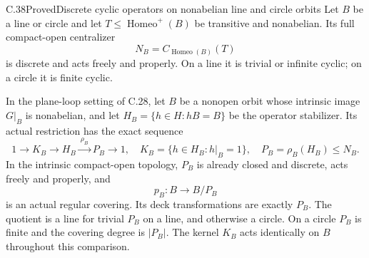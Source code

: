 \begin{claim}{C.38}{Proved}{Discrete cyclic operators on nonabelian line and circle orbits}
Let $B$ be a line or circle and let
$T\leq\operatorname{Homeo}^+(B)$ be transitive and
nonabelian. Its full compact-open centralizer
\[
                  N_B=C_{\operatorname{Homeo}(B)}(T)
                                                        \tag{C.38.1}
\]
is discrete and acts freely and properly. On a line it is
trivial or infinite cyclic; on a circle it is finite cyclic.

In the plane-loop setting of C.28, let $B$ be a nonopen
orbit whose intrinsic image $G|_B$ is nonabelian, and let
$H_B=\{h\in H:hB=B\}$ be the operator stabilizer.
Its actual restriction has the exact sequence
\[
 1\longrightarrow K_B\longrightarrow H_B
       \xrightarrow{\ \rho_B\ } P_B\longrightarrow1,
 \quad
 K_B=\{h\in H_B:h|_B=1\},\quad P_B=\rho_B(H_B)\leq N_B.
                                                        \tag{C.38.2}
\]
In the intrinsic compact-open topology, $P_B$ is already
closed and discrete, acts freely and properly, and
\[
                    p_B:B\longrightarrow B/P_B
                                                        \tag{C.38.3}
\]
is an actual regular covering. Its deck transformations
are exactly $P_B$. The quotient is a line for trivial
$P_B$ on a line, and otherwise a circle. On a circle
$P_B$ is finite and the covering degree is $|P_B|$.
The kernel $K_B$ acts identically on $B$ throughout this
comparison.
\end{claim}

